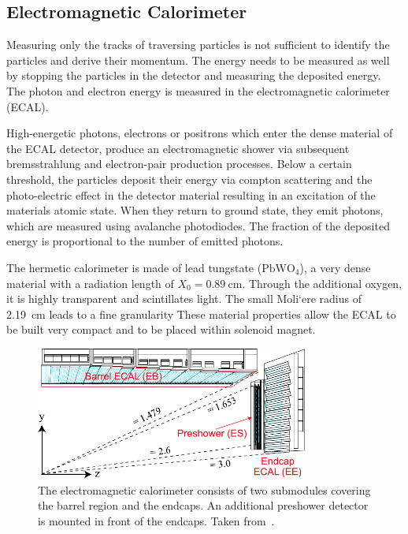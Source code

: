 \subsection{Electromagnetic Calorimeter}

Measuring only the tracks of traversing particles is not sufficient to identify
the particles and derive their momentum. The energy needs to be measured as well
by stopping the particles in the detector and measuring the
deposited energy. The photon and electron energy is measured in the
electromagnetic calorimeter (ECAL). 

High-energetic photons, electrons or positrons which enter the dense material of
the ECAL detector, produce an electromagnetic shower via subsequent
bremsstrahlung and electron-pair production processes. Below a certain
threshold, the particles deposit their energy via compton scattering and the
photo-electric effect in the detector material resulting in an excitation of
the materials atomic state. When they return to ground state, they emit photons,
which are measured using avalanche photodiodes. The fraction of the deposited
energy is proportional to the number of emitted photons.

The hermetic calorimeter is made of lead tungstate ($\mathrm{PbWO}_4$), a very
dense material with a radiation length of $X_0 = \SI{0.89}{\centi\meter}$.
Through the additional oxygen, it is highly transparent and scintillates light.
The small Moli`ere  radius of \SI{2.19}{\centi\meter} leads to a fine granularity
These material properties allow the ECAL to be built very compact and to
be placed within solenoid magnet. 

\begin{figure}[htp]
    \centering
    \includegraphics[width=0.8\textwidth]{figures/cms_detector/cms_ecal.pdf}\hfill
    \caption[Electromagnetic Calorimeter]{The electromagnetic calorimeter
    consists of two submodules covering the barrel region and the endcaps.
    An additional preshower detector is mounted in front of the
    endcaps. Taken from~\cite{cms:ecal}.}
    \label{fig:cms:ecal}
\end{figure}

